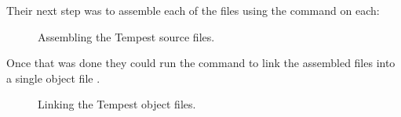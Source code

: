 Their next step was to assemble each of the files using the  command on each:
\begin{figure}[H]
			\centering
		\caption{Assembling the Tempest source files.}
\end{figure}

Once that was done they could run the  command to link the assembled files into a
single object file .
\begin{figure}[H]
			\centering
		\caption{Linking the Tempest object files.}
\end{figure}


